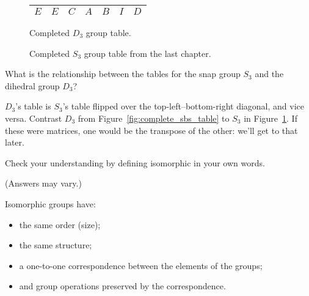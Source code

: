 \documentclass[../key.tex]{subfiles}
\begin{document}
\begin{figure}[h]
\begin{center}
\begin{minipage}[b]{0.45\textwidth}
\begin{tabular}{c|cccccc}
				$E$ & $E$ & $C$ & $A$ & $B$ & $I$ & $D$ \\ \hline
			\end{tabular}
			\vspace*{0.5\baselineskip}
		\end{minipage}
	\end{center}
	\vspace*{-2\baselineskip}
	\begin{center}
		\begin{minipage}[t]{0.45\textwidth}
			\caption{Completed $D_3$ group table.}
			\label{fig:complete_sbs_table}
		\end{minipage}
		\hfill
		\begin{minipage}[t]{0.45\textwidth}
			\caption{Completed $S_3$ group table from the last chapter.}
			\label{fig:complete_sts_table}
		\end{minipage}
	\end{center}
	\vspace*{-2\baselineskip}
\end{figure}

\begin{outer_problem}
\item What is the relationship between the tables for the snap group $S_3$ and the dihedral group $D_3$?
\end{outer_problem}

\noindent$D_3$'s table is $S_3$'s table flipped over the top-left--bottom-right diagonal, and vice versa. Contrast $D_3$ from Figure~\ref{fig:complete_sbs_table} to $S_3$ in Figure~\ref{fig:complete_sts_table}. If these were matrices, one would be the transpose of the other: we'll get to that later.

\begin{outer_problem}
\item Check your understanding by defining isomorphic in your own words.
\end{outer_problem}

\noindent (Answers may vary.)

Isomorphic groups have:
\begin{itemize}
\item the same order (size);
\item the same structure;
\item a one-to-one correspondence between the elements of the groups;
\item and group operations preserved by the correspondence.
\end{itemize}
\end{document}
